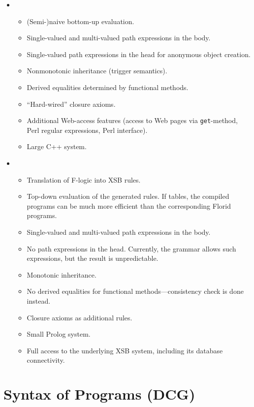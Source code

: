 \begin{itemize}
\item \FLORID
  \begin{itemize}
  \item (Semi-)naive bottom-up evaluation.
  \item Single-valued and multi-valued  path expressions in the body.
  \item Single-valued path expressions in the head for anonymous
    object creation.
  \item Nonmonotonic inheritance (trigger semantics).
  \item Derived equalities determined by functional methods.
  \item ``Hard-wired'' closure axioms.
  \item Additional Web-access features (access to Web pages via
    \texttt{get}-method, Perl regular expressions, Perl interface).
  \item Large C++ system.
  \end{itemize}
\item \FLIP
  \begin{itemize}
  \item Translation of F-logic into XSB rules.
  \item Top-down evaluation of the generated rules. If tables, the compiled 
    programs can be much more efficient than the corresponding Florid
    programs.
  \item Single-valued and multi-valued  path expressions in the body.
  \item No path expressions in the head. Currently, the grammar allows such 
    expressions, but the result is unpredictable.
  \item Monotonic inheritance.
  \item No derived equalities for functional methods---consistency check is 
    done instead.
  \item Closure axioms as additional rules.
  \item Small Prolog system.
  \item Full access to the underlying XSB system, including its database
    connectivity.
  \end{itemize}
\end{itemize}





\section{Syntax of \FLIP Programs (DCG)}

